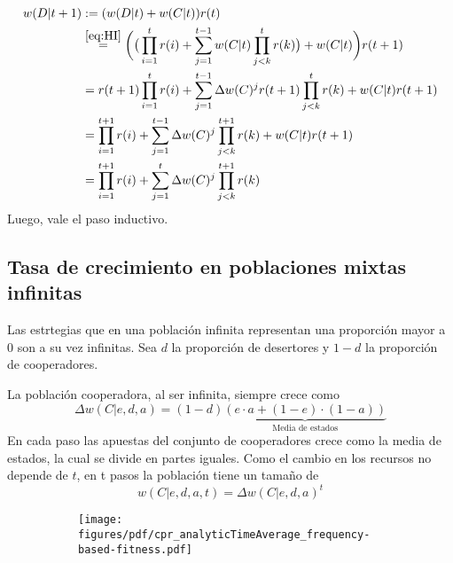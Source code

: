 \documentclass[a4paper,10pt]{article}
\begin{document}
\begin{equation}
\begin{split}
w(D|t+1) &:= (w(D|t) + w(C|t)) r(t)  \\
& \overset{\ref{eq:HI}}{=} \bigg( \big(\prod^t_{i=1} r(i) + \sum^{t-1}_{j=1} w(C|t) \prod^t_{j<k} r(k) \big)+ w(C|t) \bigg) r(t+1) \\
& = r(t+1) \prod^t_{i=1} r(i) + \sum^{t-1}_{j=1} \Delta w(C)^j r(t+1) \prod^t_{j<k} r(k) + w(C|t)  r(t+1) \\ 
& = \prod^{t+1}_{i=1} r(i) + \sum^{t-1}_{j=1} \Delta w(C)^j  \prod^{t+1}_{j<k} r(k) + w(C|t)  r(t+1)  \\
& = \prod^{t+1}_{i=1} r(i) + \sum^t_{j=1} \Delta w(C)^j  \prod^{t+1}_{j<k} r(k) 
\end{split}
\end{equation}
Luego, vale el paso inductivo. 




\subsection{Tasa de crecimiento en poblaciones mixtas infinitas}

Las estrtegias que en una población infinita representan una proporción mayor a $0$ son a su vez infinitas.
Sea $d$ la proporción de desertores y $1-d$ la proporción de cooperadores.

% 

La población cooperadora, al ser infinita, siempre crece como
\begin{equation}
\Delta w(C|e,d,a) = (1-d) \underbrace{(e\cdot a + (1-e)\cdot(1-a))}_{\text{Media de estados}}
\end{equation}
En cada paso las apuestas del conjunto de cooperadores crece como la media de estados, la cual se divide en partes iguales.
Como el cambio en los recursos no depende de $t$, en t pasos la población tiene un tamaño de
\begin{equation}
w(C|e,d,a,t) = \Delta w(C|e,d,a)^t 
\end{equation}


\begin{figure}[H]
    \centering
    \begin{subfigure}[b]{0.66\textwidth}
    \texttt{[image: figures/pdf/cpr\_analyticTimeAverage\_frequency-based-fitness.pdf]}
    \end{subfigure}
    \caption{
    }
    \label{fig:cpr_analyticTimeAverage_frequency-based-fitness}
\end{figure}
\end{document}
